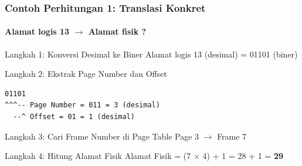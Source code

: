\documentclass[t,aspectratio=169,xcolor=dvipsnames]{beamer}
\begin{document}
\begin{frame}[fragile]
    \frametitle{Contoh Perhitungan 1: Translasi Konkret}
    \framesubtitle{Alamat logis 13 $\rightarrow$ Alamat fisik ?}
    \scriptsize

    \begin{block}{Langkah 1: Konversi Desimal ke Biner}
        Alamat logis 13 (desimal) = 01101 (biner)
    \end{block}

    \begin{block}{Langkah 2: Ekstrak Page Number dan Offset}
        \begin{lstlisting}[basicstyle=\ttfamily\scriptsize,breaklines=true]
01101
^^^-- Page Number = 011 = 3 (desimal)
  --^ Offset = 01 = 1 (desimal)
        \end{lstlisting}
    \end{block}

    \begin{block}{Langkah 3: Cari Frame Number di Page Table}
        Page 3 $\rightarrow$ Frame 7
    \end{block}

    \begin{block}{Langkah 4: Hitung Alamat Fisik}
        Alamat Fisik = (7 $\times$ 4) + 1 = 28 + 1 = \textbf{29}
    \end{block}
\end{frame}
\end{document}
